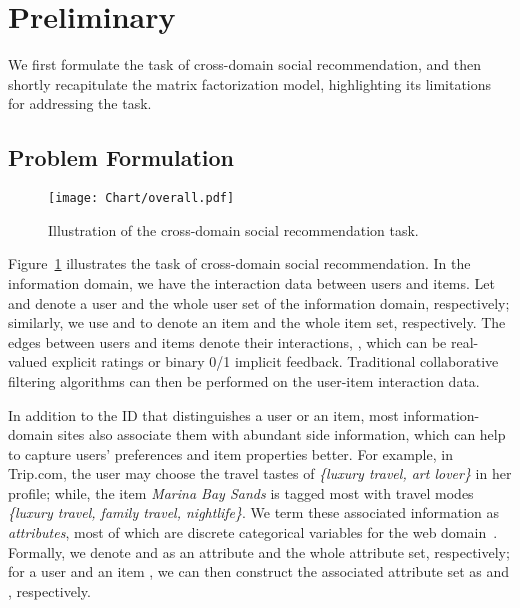\documentclass[sigconf]{acmart}
\begin{document}
\section{Preliminary}
We first formulate the task of cross-domain social recommendation, and then shortly recapitulate the matrix factorization model, highlighting its limitations for addressing the task.
\subsection{Problem Formulation}
\begin{figure}
	\centering
\texttt{[image: Chart/overall.pdf]}\\
	\vspace{-5pt}
	\caption{Illustration of the cross-domain social recommendation task.}\label{fig:framework}
	\vspace{-1em}
\end{figure}

Figure~\ref{fig:framework} illustrates the task of cross-domain social recommendation.
In the information domain, we have the interaction data between users and items.
Let  and  denote a user and the whole user set of the information domain, respectively; similarly, we use  and  to denote an item and the whole item set, respectively.
The edges between users and items denote their interactions, , which can be real-valued explicit ratings or binary 0/1 implicit feedback.
Traditional collaborative filtering algorithms can then be performed on the user-item interaction data.

In addition to the ID that distinguishes a user or an item, most information-domain sites also associate them with abundant side information, which can help to capture users' preferences and item properties better.
For example, in Trip.com, the user may choose the travel tastes of \emph{\{luxury travel, art lover\}} in her profile; while, the item \emph{Marina Bay Sands} is tagged most with travel modes \emph{\{luxury travel, family travel, nightlife\}}.
We term these associated information as \textit{attributes}, most of which are discrete categorical variables for the web domain~\cite{he2017neural}.
Formally, we denote  and  as an attribute and the whole attribute set, respectively; for a user  and an item , we can then construct the associated attribute set as  and , respectively.
\end{document}

